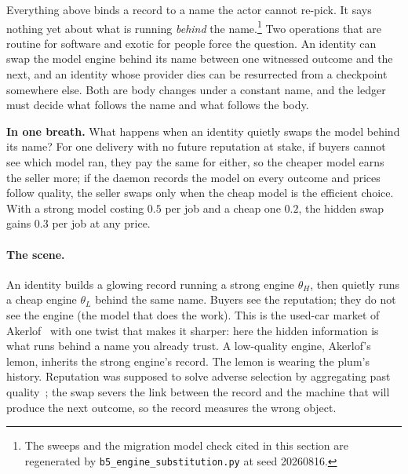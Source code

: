 \documentclass[11pt,a4paper]{article}
\theoremstyle{definition}
\begin{document}
%
Everything above binds a record to a name the actor cannot re-pick. It says
nothing yet about what is running \emph{behind} the name.\footnote{The
sweeps and the migration model check cited in this section are regenerated by
\texttt{b5\_engine\_substitution.py} at seed 20260816.} Two operations that
are routine for software and exotic for people force the question. An
identity can swap the model engine behind its name between one witnessed
outcome and the next, and an identity whose provider dies can be resurrected
from a checkpoint somewhere else. Both are body changes under a constant name,
and the ledger must decide what follows the name and what follows the body.

\medskip\noindent\textbf{In one breath.} What happens when an identity
quietly swaps the model behind its name? For one delivery with no future
reputation at stake, if buyers cannot see which model ran, they pay the same
for either, so the cheaper model earns the seller more; if the daemon records the model on every outcome and prices follow
quality, the seller swaps only when the cheap model is the efficient choice.
With a strong model costing $0.5$ per job and a cheap one $0.2$, the hidden swap
gains $0.3$ per job at any price.

\paragraph{The scene.} An identity builds a glowing record running a strong
engine $\theta_H$, then quietly runs a cheap engine $\theta_L$ behind the same
name. Buyers see the reputation; they do not see the engine (the model that
does the work). This is the used-car market of Akerlof~
with one twist that makes it sharper: here the hidden information is what runs
behind a name you already trust. A low-quality engine, Akerlof's lemon,
inherits the strong engine's record. The lemon is wearing the plum's history.
Reputation was supposed to solve adverse selection by
aggregating past quality~; the swap severs the link
between the record and the machine that will produce the next outcome, so the
record measures the wrong object.
\end{document}
